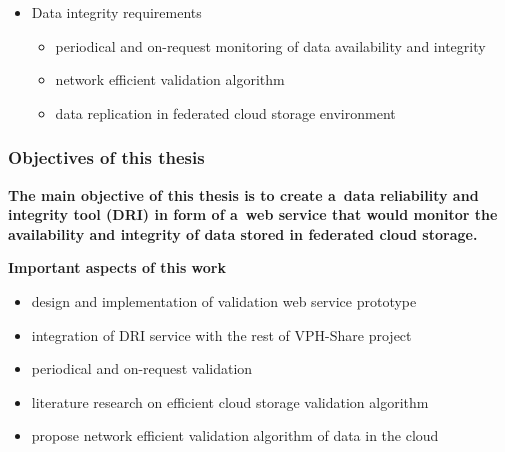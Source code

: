 \documentclass[9pt]{beamer}
\begin{document}
\begin{frame}
\begin{block}{}
\begin{itemize}
\begin{itemize}
\begin{figure}
		\end{figure}
	\end{itemize}
	\item Data integrity requirements
	\begin{itemize}
		\item periodical and on-request monitoring of data availability and integrity
		\item network efficient validation algorithm
		\item data replication in federated cloud storage environment
	\end{itemize}
\end{itemize}
\end{block}
\end{frame}


\begin{frame}
\frametitle{\hspace{5mm} \textbf{Objectives of this thesis}}
\begin{block}{}
\textbf{The main objective of this thesis is to create a~data reliability and integrity tool
(DRI) in form of a~web service that would monitor the availability and integrity of data stored
in federated cloud storage.}
\end{block}
\begin{block}{}
\textbf{Important aspects of this work} 
\begin{itemize}
	\item design and implementation of validation web service prototype
	\item integration of DRI service with the rest of VPH-Share project
	\item periodical and on-request validation
	\item literature research on efficient cloud storage validation algorithm
	\item propose network efficient validation algorithm of data in the cloud
\end{itemize}
\end{block}
\end{frame}

\end{document}
